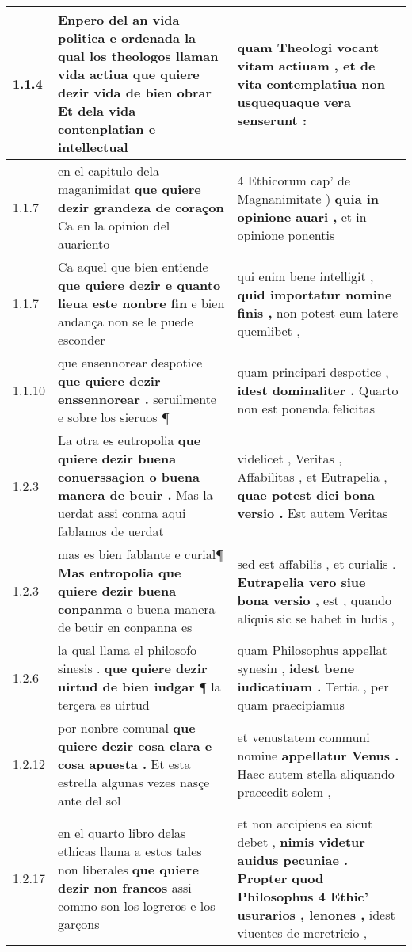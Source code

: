 \begin{tabular}{|p{1cm}|p{6.5cm}|p{6.5cm}|}

\hline
1.1.4 & Enpero del an vida politica e ordenada la qual los theologos llaman vida actiua \textbf{ que quiere dezir vida de bien obrar } Et dela vida contenplatian e intellectual & quam Theologi vocant vitam actiuam , \textbf{ et de vita contemplatiua } non usquequaque vera senserunt : \\\hline
1.1.7 & en el capitulo dela maganimidat \textbf{ que quiere dezir grandeza de coraçon } Ca en la opinion del auariento & 4 Ethicorum cap’ de Magnanimitate ) \textbf{ quia in opinione auari , } et in opinione ponentis \\\hline
1.1.7 & Ca aquel que bien entiende \textbf{ que quiere dezir e quanto lieua este nonbre fin } e bien andança non se le puede esconder & qui enim bene intelligit , \textbf{ quid importatur nomine finis , } non potest eum latere quemlibet , \\\hline
1.1.10 & que ensennorear despotice \textbf{ que quiere dezir enssennorear . } seruilmente e sobre los sieruos ¶ & quam principari despotice , \textbf{ idest dominaliter . } Quarto non est ponenda felicitas \\\hline
1.2.3 & La otra es eutropolia \textbf{ que quiere dezir buena conuerssaçion o buena manera de beuir . } Mas la uerdat assi conma aqui fablamos de uerdat & videlicet , Veritas , Affabilitas , et Eutrapelia , \textbf{ quae potest dici bona versio . } Est autem Veritas \\\hline
1.2.3 & mas es bien fablante e curial¶ \textbf{ Mas entropolia que quiere dezir buena conpanma } o buena manera de beuir en conpanna es & sed est affabilis , et curialis . \textbf{ Eutrapelia vero siue bona versio , } est , quando aliquis sic se habet in ludis , \\\hline
1.2.6 & la qual llama el philosofo sinesis . \textbf{ que quiere dezir uirtud de bien iudgar } ¶ la terçera es uirtud & quam Philosophus appellat synesin , \textbf{ idest bene iudicatiuam . } Tertia , per quam praecipiamus \\\hline
1.2.12 & por nonbre comunal \textbf{ que quiere dezir cosa clara e cosa apuesta . } Et esta estrella algunas vezes nasçe ante del sol & et venustatem communi nomine \textbf{ appellatur Venus . } Haec autem stella aliquando praecedit solem , \\\hline
1.2.17 & en el quarto libro delas ethicas llama a estos tales non liberales \textbf{ que quiere dezir non francos } assi commo son los logreros e los garçons & et non accipiens ea sicut debet , \textbf{ nimis videtur auidus pecuniae . Propter quod Philosophus 4 Ethic’ usurarios , lenones , } idest viuentes de meretricio , \\\hline

\end{tabular}
